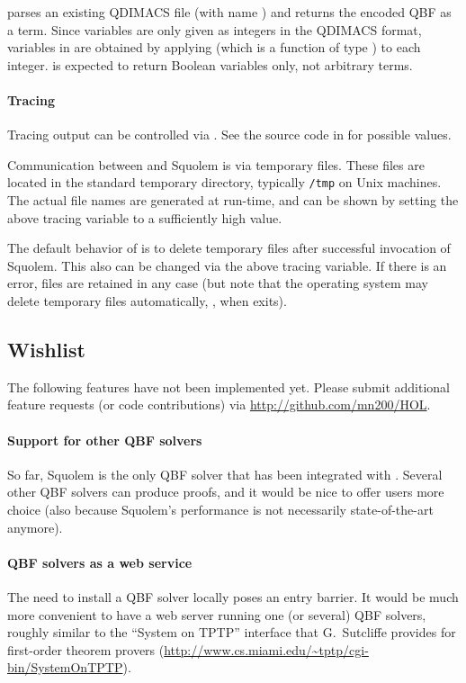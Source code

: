  parses an existing QDIMACS
file (with name ) and returns the encoded QBF as a \HOL{}
term.  Since variables are only given as integers in the QDIMACS
format, variables in \HOL{} are obtained by applying  (which is
a function of type ) to each integer.   is
expected to return Boolean variables only, not arbitrary \HOL{} terms.

\paragraph{Tracing}

Tracing output can be controlled via .  See the source code in  for possible
values.

Communication between \HOL{} and Squolem is via temporary files.
These files are located in the standard temporary directory, typically
{\tt /tmp} on Unix machines.  The actual file names are generated at
run-time, and can be shown by setting the above tracing variable to a
sufficiently high value.

The default behavior of  is to delete temporary files
after successful invocation of Squolem.  This also can be changed via
the above tracing variable.  If there is an error, files are retained
in any case (but note that the operating system may delete temporary
files automatically, \eg, when \HOL{} exits).

\subsection{Wishlist}

The following features have not been implemented yet.
Please submit additional feature requests (or code contributions) via \url{http://github.com/mn200/HOL}.

\paragraph{Support for other QBF solvers}

So far, Squolem is the only QBF solver that has been integrated with
\HOL.  Several other QBF solvers can produce proofs, and it would be
nice to offer \HOL{} users more choice (also because Squolem's
performance is not necessarily state-of-the-art anymore).

\paragraph{QBF solvers as a web service}

The need to install a QBF solver locally poses an entry barrier.  It
would be much more convenient to have a web server running one (or
several) QBF solvers, roughly similar to the ``System on TPTP''
interface that G.~Sutcliffe provides for first-order theorem provers
(\url{http://www.cs.miami.edu/~tptp/cgi-bin/SystemOnTPTP}).


